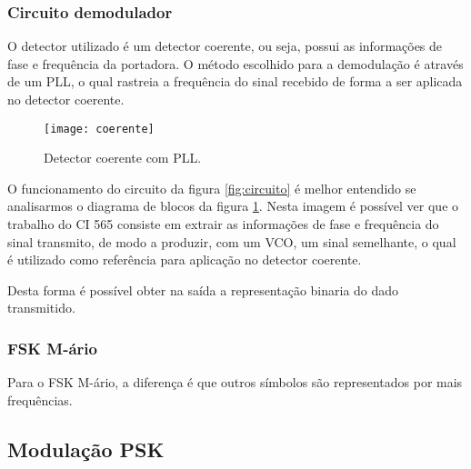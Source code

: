 \subsubsection{Circuito demodulador}

O detector utilizado é um detector coerente, ou seja, possui as informações de fase e frequência da portadora. O método escolhido para a demodulação é através de um PLL, o qual rastreia a frequência do sinal recebido de forma a ser aplicada no detector coerente.



\begin{figure}[H]
    \centering
    \texttt{[image: coerente]}
    \caption{Detector coerente com PLL.}
    \label{fig:detector}
\end{figure}

O funcionamento do circuito da figura \ref{fig:circuito} é melhor entendido se analisarmos o diagrama de blocos da figura \ref{fig:detector}. Nesta imagem é possível ver que o trabalho do CI 565 consiste em extrair as informações de fase e frequência do sinal transmito, de modo a produzir, com um VCO, um sinal semelhante, o qual é utilizado como referência para aplicação no detector coerente.

Desta forma é possível obter na saída a representação binaria do dado transmitido.

\subsubsection{FSK M-ário}
Para o FSK M-ário, a diferença é que outros símbolos são representados por mais frequências.

\subsection{Modulação PSK}